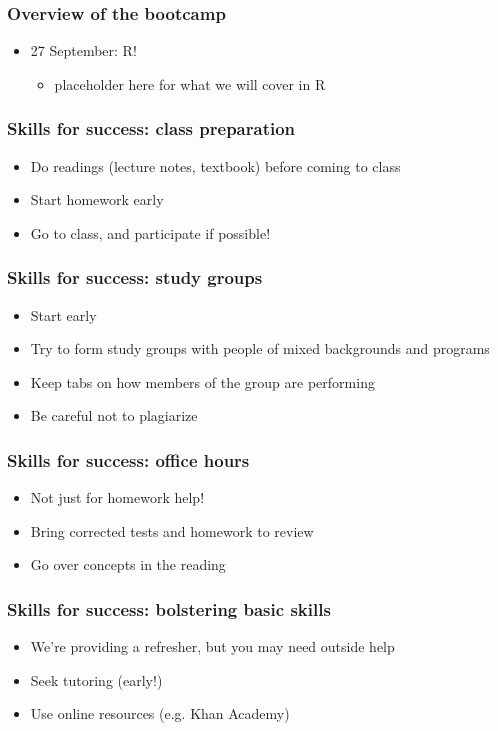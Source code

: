 \documentclass[12pt]{beamer}
\newcommand{\myframe}[1]{\begin{frame} \frametitle{#1}}
\newenvironment{spaceitemize}
{ \begin{itemize}
    \setlength{\itemsep}{10pt}
    \setlength{\parskip}{0pt}
    \setlength{\parsep}{0pt}     }
{ \end{itemize}                  }
\begin{document}
\myframe{Overview of the bootcamp}
\begin{spaceitemize}
\item 27 September: R! 
\begin{spaceitemize}
\item placeholder here for what we will cover in R
\end{spaceitemize}
\end{spaceitemize}
\end{frame}

\myframe{Skills for success: class preparation}
\begin{spaceitemize}
\item Do readings (lecture notes, textbook) before coming to class
\item Start homework early
\item Go to class, and participate if possible!
\end{spaceitemize}
\end{frame}

\myframe{Skills for success: study groups}
\begin{spaceitemize}
\item Start early
\item Try to form study groups with people of mixed backgrounds and programs
\item Keep tabs on how members of the group are performing
\item Be careful not to plagiarize
\end{spaceitemize}
\end{frame}

\myframe{Skills for success: office hours}
\begin{spaceitemize}
\item Not just for homework help!
\item Bring corrected tests and homework to review
\item Go over concepts in the reading
\end{spaceitemize}
\end{frame}

\myframe{Skills for success: bolstering basic skills}
\begin{spaceitemize}
\item We're providing a refresher, but you may need outside help
\item Seek tutoring (early!)
\item Use online resources (e.g. Khan Academy)
\end{spaceitemize}
\end{frame}
\end{document}

